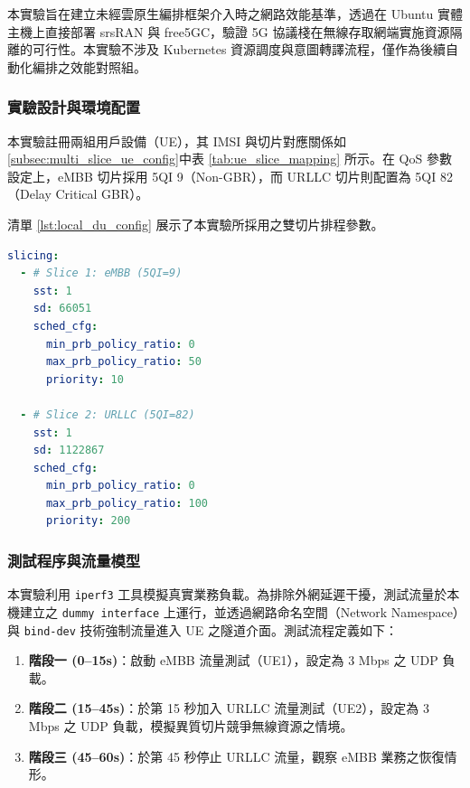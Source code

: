 本實驗旨在建立未經雲原生編排框架介入時之網路效能基準，透過在 Ubuntu 實體主機上直接部署 srsRAN 與 free5GC，驗證 5G 協議棧在無線存取網端實施資源隔離的可行性。本實驗不涉及 Kubernetes 資源調度與意圖轉譯流程，僅作為後續自動化編排之效能對照組。

\subsubsection{實驗設計與環境配置}
本實驗註冊兩組用戶設備（UE），其 IMSI 與切片對應關係如\ref{subsec:multi_slice_ue_config}中表 \ref{tab:ue_slice_mapping} 所示。在 QoS 參數設定上，eMBB 切片採用 5QI 9（Non-GBR），而 URLLC 切片則配置為 5QI 82（Delay Critical GBR）。

清單 \ref{lst:local_du_config} 展示了本實驗所採用之雙切片排程參數。

\begin{lstlisting}[language=yaml, caption={實體機實驗之 DU 雙切片排程配置參數}, label={lst:local_du_config}]
slicing:
  - # Slice 1: eMBB (5QI=9)
    sst: 1
    sd: 66051
    sched_cfg:
      min_prb_policy_ratio: 0
      max_prb_policy_ratio: 50
      priority: 10

  - # Slice 2: URLLC (5QI=82)
    sst: 1
    sd: 1122867
    sched_cfg:
      min_prb_policy_ratio: 0
      max_prb_policy_ratio: 100
      priority: 200
\end{lstlisting}

\subsubsection{測試程序與流量模型}
本實驗利用 \texttt{iperf3} 工具模擬真實業務負載。為排除外網延遲干擾，測試流量於本機建立之 \texttt{dummy interface} 上運行，並透過網路命名空間（Network Namespace）與 \texttt{bind-dev} 技術強制流量進入 UE 之隧道介面。測試流程定義如下：

\begin{enumerate}
    \item \textbf{階段一 (0--15s)}：啟動 eMBB 流量測試（UE1），設定為 3 Mbps 之 UDP 負載。
    \item \textbf{階段二 (15--45s)}：於第 15 秒加入 URLLC 流量測試（UE2），設定為 3 Mbps 之 UDP 負載，模擬異質切片競爭無線資源之情境。
    \item \textbf{階段三 (45--60s)}：於第 45 秒停止 URLLC 流量，觀察 eMBB 業務之恢復情形。
\end{enumerate}

